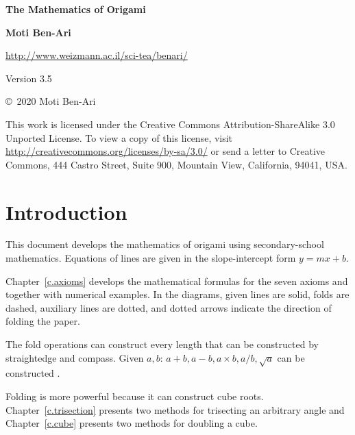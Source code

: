 
\thispagestyle{empty}

\begin{center}
\textbf{\LARGE The Mathematics of Origami}

\bigskip
\bigskip

\textbf{\Large Moti Ben-Ari}

\bigskip
\bigskip

\url{http://www.weizmann.ac.il/sci-tea/benari/}

\bigskip
\bigskip

Version 3.5
\end{center}

\vfill

\begin{small}
\begin{center}
\copyright{}\ 2020 Moti Ben-Ari
\end{center}

This work is licensed under the Creative Commons Attribution-ShareAlike 3.0 Unported License. To view a copy of this license, visit \url{http://creativecommons.org/licenses/by-sa/3.0/} or send a letter to Creative Commons, 444 Castro Street, Suite 900, Mountain View, California, 94041, USA.
\end{small}

\tableofcontents



\chapter{Introduction}\label{c.introduction}

This document develops the mathematics of origami using secondary-school mathematics. Equations of lines are given in the slope-intercept form $y=mx+b$.

Chapter~\ref{c.axioms} develops the mathematical formulas for the seven axioms and together with numerical examples. In the diagrams, given lines are solid, folds are dashed, auxiliary lines are dotted, and dotted arrows indicate the direction of folding the paper.

The fold operations can construct every length that can be constructed by straightedge and compass. Given $a,b$: $a+b, a-b, a\times b, a/b, \sqrt{a}$ can be constructed \cite[Chapter~4]{hwa}.

Folding is more powerful because it can construct cube roots. Chapter~\ref{c.trisection} presents two methods for trisecting an arbitrary angle and Chapter~\ref{c.cube} presents two methods for doubling a cube.

